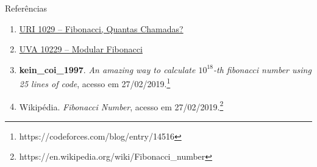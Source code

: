 \begin{frame}[fragile]{Referências}

    \begin{enumerate}
        \item \href{https://www.urionlinejudge.com.br/judge/pt/problems/view/1029}{URI 1029 -- Fibonacci, Quantas Chamadas?}

        \item \href{https://uva.onlinejudge.org/index.php?option=onlinejudge&page=show_problem&problem=1170}{UVA 10229 -- Modular Fibonacci}

        \item \textbf{kein\_coi\_1997}. \textit{An amazing way to calculate $10^{18}$-th fibonacci number using 25 lines of code}, acesso em 27/02/2019.\footnote{https://codeforces.com/blog/entry/14516}

        \item Wikipédia. \textit{Fibonacci Number}, acesso em 27/02/2019.\footnote{https://en.wikipedia.org/wiki/Fibonacci\_number}

    \end{enumerate}

\end{frame}

